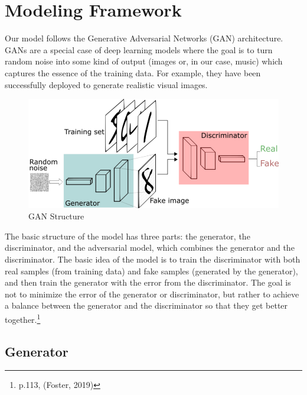 \documentclass[12pt,oneside]{chicagocapstone}
\begin{document}
\newpage

\hypertarget{methodology-modeling}{%
\section*{Modeling Framework}\label{methodology-modeling}}

Our model follows the Generative Adversarial Networks (GAN) architecture. GANs are a special case of deep learning models where the goal is to turn random noise into some kind of output (images or, in our case, music) which captures the essence of the training data. For example, they have been successfully deployed to generate realistic visual images.
\begin{figure}

{\centering \includegraphics[width=0.8\linewidth]{figure/GAN_structure} 

}

\caption{GAN Structure}\label{fig:unnamed-chunk-4}
\end{figure}
The basic structure of the model has three parts: the generator, the discriminator, and the adversarial model, which combines the generator and the discriminator. The basic idea of the model is to train the discriminator with both real samples (from training data) and fake samples (generated by the generator), and then train the generator with the error from the discriminator. The goal is not to minimize the error of the generator or discriminator, but rather to achieve a balance between the generator and the discriminator so that they get better together.\footnote{p.113, (Foster, 2019)}

\hypertarget{generator}{%
\subsection*{Generator}\label{generator}}
\end{document}
